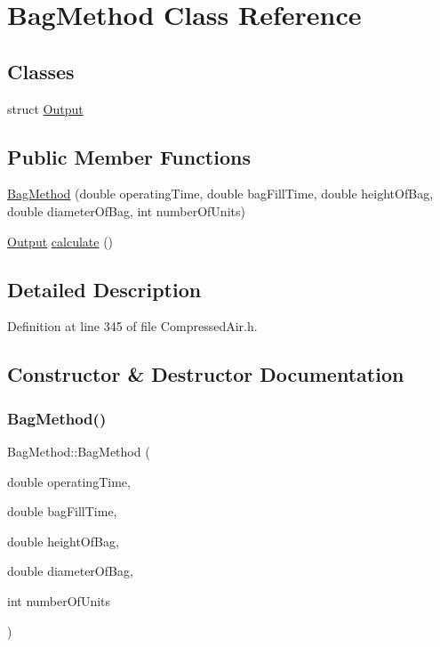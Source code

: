 \hypertarget{class_bag_method}{}\section{Bag\+Method Class Reference}
\label{class_bag_method}
\subsection*{Classes}
\begin{DoxyCompactItemize}
\item 
struct \hyperlink{struct_bag_method_1_1_output}{Output}
\end{DoxyCompactItemize}
\subsection*{Public Member Functions}
\begin{DoxyCompactItemize}
\item 
\hyperlink{class_bag_method_ade40cf50da337fb5f83aae1d72698b56}{Bag\+Method} (double operating\+Time, double bag\+Fill\+Time, double height\+Of\+Bag, double diameter\+Of\+Bag, int number\+Of\+Units)
\item 
\hyperlink{struct_bag_method_1_1_output}{Output} \hyperlink{class_bag_method_ab0a8d6b47bf81afbef47d8aaf1c1943c}{calculate} ()
\end{DoxyCompactItemize}


\subsection{Detailed Description}


Definition at line 345 of file Compressed\+Air.\+h.



\subsection{Constructor \& Destructor Documentation}
\mbox{\label{class_bag_method_ade40cf50da337fb5f83aae1d72698b56}} 
\subsubsection{\texorpdfstring{Bag\+Method()}{BagMethod()}}
{\footnotesize\ttfamily Bag\+Method\+::\+Bag\+Method (\begin{DoxyParamCaption}\item[{double}]{operating\+Time,  }\item[{double}]{bag\+Fill\+Time,  }\item[{double}]{height\+Of\+Bag,  }\item[{double}]{diameter\+Of\+Bag,  }\item[{int}]{number\+Of\+Units }\end{DoxyParamCaption})}

